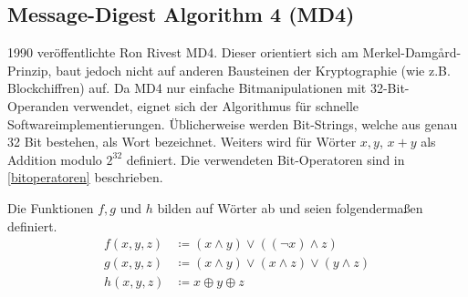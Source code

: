 \documentclass[12pt,a4paper]{scrartcl}
\numberwithin{equation}{section}
\numberwithin{myalgctr}{section}
\numberwithin{mytheoremctr}{section}
\begin{document}
	\subsection{Message-Digest Algorithm 4 (MD4)}\label{md4}
	1990 veröffentlichte Ron Rivest MD4. Dieser orientiert sich am Merkel-Damg\aa rd-Prinzip, baut jedoch nicht auf anderen Bausteinen der Kryptographie (wie z.B. Blockchiffren) auf. Da MD4 nur einfache Bitmanipulationen mit 32-Bit-Operanden verwendet, eignet sich der Algorithmus für schnelle Softwareimplementierungen. Üblicherweise werden Bit-Strings, welche aus genau 32 Bit bestehen, als Wort bezeichnet. Weiters wird für Wörter $x,y$, $x +y$ als Addition modulo $2^{32}$ definiert. Die verwendeten Bit-Operatoren sind in \cref{bitoperatoren} beschrieben.\autocite[vgl.][S. 19~f.]{md4Familie}
	\par\noindent
	Die Funktionen $f,g$ und $h$ bilden auf Wörter ab und seien folgendermaßen definiert.
	\begin{align}
	f(x,y,z) &\coloneqq (x\wedge y) \vee ((\neg x)\wedge z)\\ \label{md4-f}
	g(x,y,z) &\coloneqq (x\wedge y) \vee (x\wedge z)\vee (y\wedge z)\\
	h(x,y,z) &\coloneqq x\oplus y \oplus z
	\end{align}


	
\end{document}
